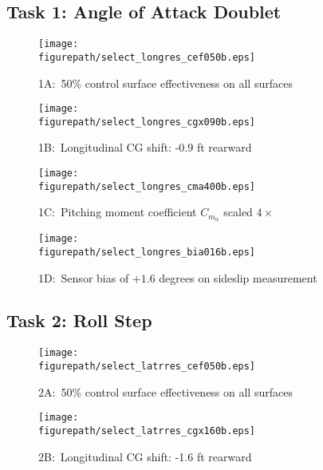\subsection{Task 1: Angle of Attack Doublet}

\begin{figure}[H]
  \begin{center}
    \texttt{[image: \\figurepath/select\_longres\_cef050b.eps]}
    \caption{1A:\ 50\% control surface effectiveness on all surfaces}
  \end{center}
\end{figure}

\begin{figure}[H]
  \begin{center}
    \texttt{[image: \\figurepath/select\_longres\_cgx090b.eps]}
    \caption{1B:\ Longitudinal CG shift: -0.9 ft rearward}
  \end{center}
\end{figure}

\begin{figure}[H]
  \begin{center}
    \texttt{[image: \\figurepath/select\_longres\_cma400b.eps]}
    \caption{1C:\ Pitching moment coefficient $C_{m_{\alpha}}$ scaled $4\times$}
  \end{center}
\end{figure}

\begin{figure}[H]
  \begin{center}
    \texttt{[image: \\figurepath/select\_longres\_bia016b.eps]}
    \caption{1D:\ Sensor bias of $+1.6$ degrees on sideslip measurement}
  \end{center}
\end{figure}

\subsection{Task 2: Roll Step}

\begin{figure}[H]
  \begin{center}
    \texttt{[image: \\figurepath/select\_latrres\_cef050b.eps]}
    \caption{2A:\ 50\% control surface effectiveness on all surfaces}
  \end{center}
\end{figure}

\begin{figure}[H]
  \begin{center}
    \texttt{[image: \\figurepath/select\_latrres\_cgx160b.eps]}
    \caption{2B:\ Longitudinal CG shift: -1.6 ft rearward}
  \end{center}
\end{figure}


